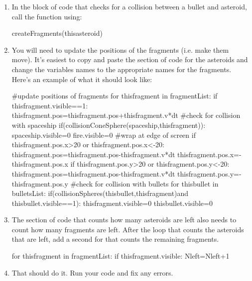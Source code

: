 \begin{enumerate}
\item In the block of code that checks for a collision between a bullet and asteroid, call the  function using:

\begin{myvpython}
                   createFragments(thisasteroid)
\end{myvpython}

\item You will need to update the positions of the fragments (i.e. make them move). It's easiest to copy and paste the section of code for the asteroids and change the variables names to the appropriate names for the fragments. Here's an example of what it should look like:

\begin{myvpython}
    #update positions of fragments
    for thisfragment in fragmentList:
        if thisfragment.visible==1:
            thisfragment.pos=thisfragment.pos+thisfragment.v*dt
            #check for collision with spaceship
            if(collisionConeSphere(spaceship,thisfragment)):
                spaceship.visible=0
                fire.visible=0
            #wrap at edge of screen
            if thisfragment.pos.x>20 or thisfragment.pos.x<-20:
                thisfragment.pos=thisfragment.pos-thisfragment.v*dt
                thisfragment.pos.x=-thisfragment.pos.x
            if thisfragment.pos.y>20 or thisfragment.pos.y<-20:
                thisfragment.pos=thisfragment.pos-thisfragment.v*dt
                thisfragment.pos.y=-thisfragment.pos.y
            #check for collision with bullets
            for thisbullet in bulletsList:
                if(collisionSpheres(thisbullet,thisfragment)and thisbullet.visible==1):
                   thisfragment.visible=0
                   thisbullet.visible=0
\end{myvpython}

\item The section of code that counts how many asteroids are left also needs to count how many fragments are left. After the  loop that counts the asteroids that are left, add a second for  that counts the remaining fragments.

\begin{myvpython}
    for thisfragment in fragmentList:
        if thisfragment.visible:
            Nleft=Nleft+1
\end{myvpython}

\item That should do it. Run your code and fix any errors.


\end{enumerate}

